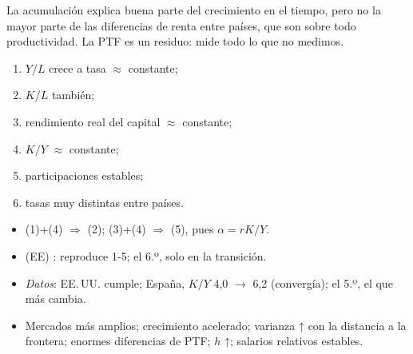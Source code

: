 \documentclass{article}
\begin{document}
\begin{columnas}
\begin{itemize}
\end{itemize}

\begin{ideaclave}
La acumulación explica buena parte del crecimiento en el tiempo, pero no la mayor parte de las diferencias de renta entre países, que son sobre todo productividad. La PTF es un residuo: mide todo lo que no medimos.
\end{ideaclave}

\begin{enumerate}
\item $Y/L$ crece a tasa $\approx$ constante;
\item $K/L$ también;
\item rendimiento real del capital $\approx$ constante;
\item $K/Y$ $\approx$ constante;
\item participaciones estables;
\item tasas muy distintas entre países.
\end{enumerate}
\begin{itemize}
\item (1)+(4) $\Rightarrow$ (2); (3)+(4) $\Rightarrow$ (5), pues $\alpha=rK/Y$.
\end{itemize}
\begin{itemize}
\item {} (EE) : reproduce 1-5; el 6.º, solo en la transición.
\item \emph{Datos}: EE.\,UU. cumple; España, $K/Y$ 4,0 $\to$ 6,2 (convergía); el 5.º, el que más cambia.
\end{itemize}
\begin{itemize}
\item Mercados más amplios; crecimiento acelerado; varianza ↑ con la distancia a la frontera; enormes diferencias de PTF; $h$ ↑; salarios relativos estables.
\end{itemize}


\end{columnas}
\end{document}
